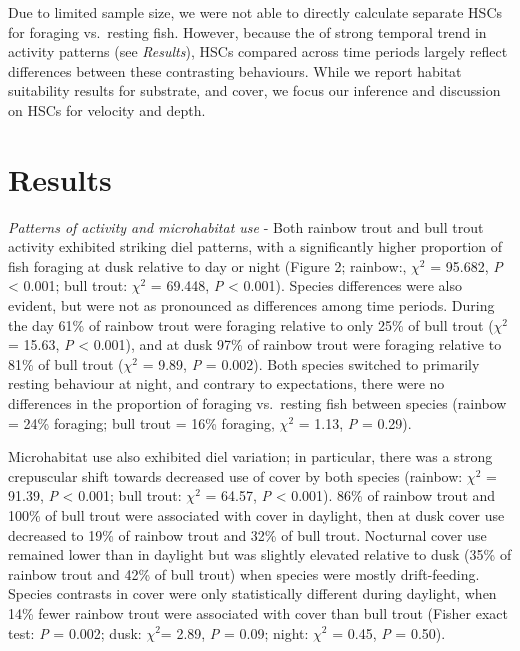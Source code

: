\documentclass[]{article}
\begin{document}
Due to limited sample size, we were not able to directly calculate
separate HSCs for foraging vs.~resting fish. However, because the of
strong temporal trend in activity patterns (see \emph{Results}), HSCs
compared across time periods largely reflect differences between these
contrasting behaviours. While we report habitat suitability results for
substrate, and cover, we focus our inference and discussion on HSCs for
velocity and depth.

\section{Results}\label{results}

\emph{Patterns of activity and microhabitat use} - Both rainbow trout
and bull trout activity exhibited striking diel patterns, with a
significantly higher proportion of fish foraging at dusk relative to day
or night (Figure 2; rainbow:, \(\chi^2\) = 95.682, \emph{P} \textless{}
0.001; bull trout: \(\chi^2\) = 69.448, \emph{P} \textless{} 0.001).
Species differences were also evident, but were not as pronounced as
differences among time periods. During the day 61\% of rainbow trout
were foraging relative to only 25\% of bull trout (\(\chi^2\) = 15.63,
\emph{P} \textless{} 0.001), and at dusk 97\% of rainbow trout were
foraging relative to 81\% of bull trout (\(\chi^2\) = 9.89, \emph{P} =
0.002). Both species switched to primarily resting behaviour at night,
and contrary to expectations, there were no differences in the
proportion of foraging vs.~resting fish between species (rainbow = 24\%
foraging; bull trout = 16\% foraging, \(\chi^2\) = 1.13, \emph{P} =
0.29).

Microhabitat use also exhibited diel variation; in particular, there was
a strong crepuscular shift towards decreased use of cover by both
species (rainbow: \(\chi^2\) = 91.39, \emph{P} \textless{} 0.001; bull
trout: \(\chi^2\) = 64.57, \emph{P} \textless{} 0.001). 86\% of rainbow
trout and 100\% of bull trout were associated with cover in daylight,
then at dusk cover use decreased to 19\% of rainbow trout and 32\% of
bull trout. Nocturnal cover use remained lower than in daylight but was
slightly elevated relative to dusk (35\% of rainbow trout and 42\% of
bull trout) when species were mostly drift-feeding. Species contrasts in
cover were only statistically different during daylight, when 14\% fewer
rainbow trout were associated with cover than bull trout (Fisher exact
test: \emph{P} = 0.002; dusk: \(\chi^2\)= 2.89, \emph{P} = 0.09; night:
\(\chi^2\) = 0.45, \emph{P} = 0.50).
\end{document}
